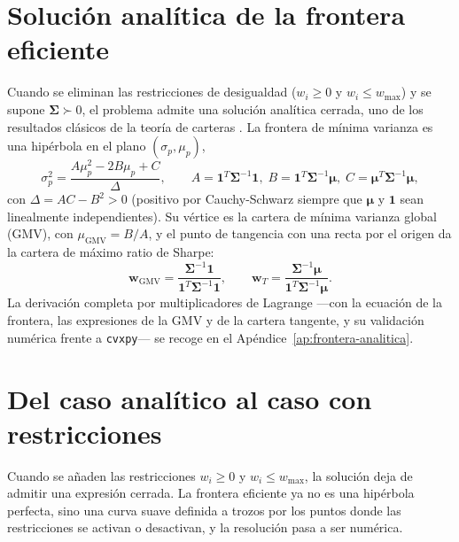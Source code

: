 \section{Solución analítica de la frontera eficiente}

Cuando se eliminan las restricciones de desigualdad ($w_i \ge 0$ y
$w_i \le w_{\max}$) y se supone $\boldsymbol{\Sigma} \succ 0$, el problema
admite una solución analítica cerrada, uno de los resultados clásicos de la
teoría de carteras \cite{Merton1972}. La frontera de mínima varianza es una
hipérbola en el plano $(\sigma_p, \mu_p)$,
\begin{equation*}
    \sigma_p^2 = \frac{A \mu_p^2 - 2B \mu_p + C}{\Delta},
    \qquad
    A = \mathbf{1}^T \boldsymbol{\Sigma}^{-1} \mathbf{1}, \;
    B = \mathbf{1}^T \boldsymbol{\Sigma}^{-1} \boldsymbol{\mu}, \;
    C = \boldsymbol{\mu}^T \boldsymbol{\Sigma}^{-1} \boldsymbol{\mu},
\end{equation*}
con $\Delta = AC - B^2 > 0$ (positivo por Cauchy-Schwarz siempre que
$\boldsymbol{\mu}$ y $\mathbf{1}$ sean linealmente independientes). Su vértice
es la cartera de mínima varianza global (GMV), con $\mu_{\text{GMV}} = B/A$, y
el punto de tangencia con una recta por el origen da la cartera de máximo ratio
de Sharpe:
\begin{equation*}
    \mathbf{w}_{\text{GMV}}
    = \frac{\boldsymbol{\Sigma}^{-1} \mathbf{1}}
           {\mathbf{1}^T \boldsymbol{\Sigma}^{-1} \mathbf{1}},
    \qquad
    \mathbf{w}_{T}
    = \frac{\boldsymbol{\Sigma}^{-1} \boldsymbol{\mu}}
           {\mathbf{1}^T \boldsymbol{\Sigma}^{-1} \boldsymbol{\mu}}.
\end{equation*}
La derivación completa por multiplicadores de Lagrange ---con la ecuación de la
frontera, las expresiones de la GMV y de la cartera tangente, y su validación
numérica frente a \texttt{cvxpy}--- se recoge en el
Apéndice~\ref{ap:frontera-analitica}.

\section{Del caso analítico al caso con restricciones}

Cuando se añaden las restricciones $w_i \ge 0$ y $w_i \le w_{\max}$,
la solución deja de admitir una expresión cerrada. La frontera eficiente
ya no es una hipérbola perfecta, sino una curva suave definida a trozos
por los puntos donde las restricciones se activan o desactivan, y la
resolución pasa a ser numérica.

